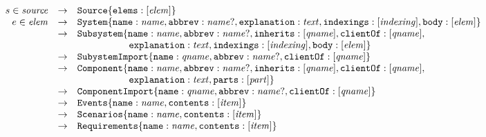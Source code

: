 \documentclass{article}
\begin{document}
\[
\begin{array}{rcll}
  s \in \nt{source} & \rightarrow &\lab{Source}\{\lab{elems}:\listof{\nt{elem}}\} \\
  e \in \nt{elem} & \rightarrow & \lab{System}\{\lab{name}:\nt{name},\lab{abbrev}:\optof{\nt{name}},
                                                \lab{explanation}:\nt{text},\lab{indexings}:\listof{\nt{indexing}},
                                                \lab{body}:\listof{\nt{elem}}\} \\
                  & \rightarrow & \lab{Subsystem}\{\lab{name}:\nt{name},\lab{abbrev}:\optof{\nt{name}},
                                                \lab{inherits}:\listof{\nt{qname}},\lab{clientOf}:\listof{\nt{qname}}, \\
                  &             & \ \ \ \ \ \ \ \ \ \ \ \ \ \ \ \                                                 
                                                \lab{explanation}:\nt{text},\lab{indexings}:\listof{\nt{indexing}},
                                                \lab{body}:\listof{\nt{elem}}\} \\
                  & \rightarrow & \lab{SubystemImport}\{\lab{name}:\nt{qname},\lab{abbrev}:\optof{\nt{name}},
                                                        \lab{clientOf}:\listof{\nt{qname}}\} \\
                  & \rightarrow &\lab{Component}\{\lab{name}:\nt{name},\lab{abbrev}:\optof{\nt{name}},
                                                \lab{inherits}:\listof{\nt{qname}},\lab{clientOf}:\listof{\nt{qname}},\\
                  &             & \ \ \ \ \ \ \ \ \ \ \ \ \ \ \ \                                                 
                                                \lab{explanation}:\nt{text},\lab{parts}:\listof{\nt{part}}\} \\
                  & \rightarrow & \lab{ComponentImport}\{\lab{name}:\nt{qname},\lab{abbrev}:\optof{\nt{name}},
                                                         \lab{clientOf}:\listof{\nt{qname}}\} \\
                  & \rightarrow & \lab{Events}\{\lab{name}:\nt{name},\lab{contents}:\listof{\nt{item}}\} \\
                  & \rightarrow & \lab{Scenarios}\{\lab{name}:\nt{name},\lab{contents}:\listof{\nt{item}}\} \\
                  & \rightarrow & \lab{Requirements}\{\lab{name}:\nt{name},\lab{contents}:\listof{\nt{item}}\} \\

\end{array}\]
\end{document}

